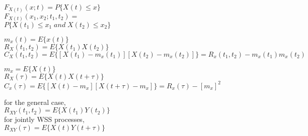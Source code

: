 
$F_{X(t)}(x;t)=P\{X(t) \leq x\}$ \\
$F_{X(t)}(x_1,x_2;t_1,t_2)=$ \\ $P\{X(t_1)\leq x_1 \; and \; X(t_2) \leq x_2\}$

$m_x(t)=E\{x(t)\}$ \\
$R_X(t_1,t_2)=E\{X(t_1)X(t_2)\}$ \\
$C_X(t_1,t_2)=E\{[X(t_1)-m_x(t_1)][X(t_2)-m_x(t_2)]\}=R_x(t_1,t_2)-m_x(t_1)m_x(t_2)$

$m_x=E\{X(t)\} $\\
$R_X(\tau)=E\{X(t)X(t+\tau)\}$ \\
$C_x(\tau) =E\{[X(t)-m_x] [X(t+\tau)-m_x]\}= R_x(\tau)-{[m_x]} ^2$ 

for the general case, \\
$R_{XY}(t_1,t_2)=E\{X(t_1)Y(t_2)\}$ \\
for jointly WSS processes, \\
$R_{XY}(\tau)=E\{X(t)Y(t+\tau)\}$

